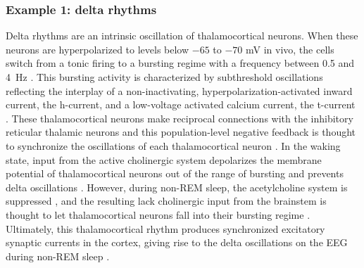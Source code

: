\subsubsection{Example 1: delta rhythms} \label{sec:delta}
Delta rhythms are an intrinsic oscillation of thalamocortical neurons. When these neurons are hyperpolarized to levels below $-65$ to $-70$ \unit{\milli\volt} in vivo, the cells switch from a tonic firing to a bursting regime with a frequency between 0.5 and \qty{4}{\hertz} \cite{Dossi1992}. This bursting activity is characterized by subthreshold oscillations reflecting the interplay of a non-inactivating, hyperpolarization-activated inward current, the h-current, and a low-voltage activated calcium current, the t-current \cite{McCormick1990,Soltesz1991}. These thalamocortical neurons make reciprocal connections with the inhibitory reticular thalamic neurons and this population-level negative feedback is thought to synchronize the oscillations of each thalamocortical neuron \cite{Steriade1991, Steriade1993}. In the waking state, input from the active cholinergic system depolarizes the membrane potential of thalamocortical neurons out of the range of bursting and prevents delta oscillations \cite{Steriade2003}. However, during non-REM sleep, the acetylcholine system is suppressed \cite{Watson2010}, and the resulting lack cholinergic input from the brainstem is thought to let thalamocortical neurons fall into their bursting regime \cite{Steriade2003}. Ultimately, this thalamocortical rhythm produces synchronized excitatory synaptic currents in the cortex, giving rise to the delta oscillations on the EEG during non-REM sleep \cite{Amzica1998}.

